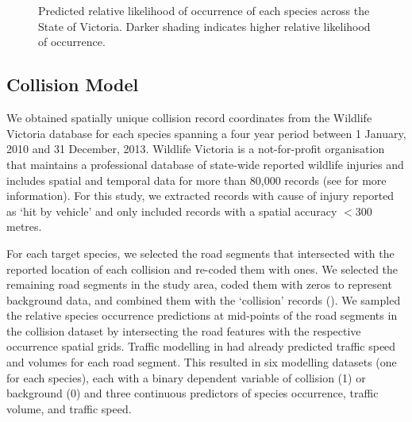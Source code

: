 \begin{figure*}[!t]
  \centering
  \\
  \\  
  \caption[Predicted relative likelihood of six mammal species occurrence in Victoria]{Predicted relative likelihood of occurrence of each species across the State of Victoria. Darker shading indicates higher relative likelihood of occurrence.}
  \label{6sp_occ_preds}
\end{figure*}

\subsection{Collision Model}

We obtained spatially unique collision record coordinates from the Wildlife Victoria database for each species spanning a four year period between 1 January, 2010 and 31 December, 2013. Wildlife Victoria is a not-for-profit organisation that maintains a professional database of state-wide reported wildlife injuries and includes spatial and temporal data for more than 80,000 records  (see  for more information).  For this study, we extracted records with cause of injury reported as `hit by vehicle' and only included records with a spatial accuracy $<$300 metres.

For each target species, we selected the road segments that intersected with the reported location of each collision and re-coded them with ones.  We selected the remaining road segments in the study area, coded them with zeros to represent background data, and combined them with the `collision' records ().  We sampled the relative species occurrence predictions at mid-points of the road segments in the collision dataset by intersecting the road features with the respective occurrence spatial grids.  Traffic modelling in  had already predicted traffic speed and volumes for each road segment.  This resulted in six modelling datasets (one for each species), each with a binary dependent variable of collision (1) or background (0) and three continuous predictors of species occurrence, traffic volume, and traffic speed.


